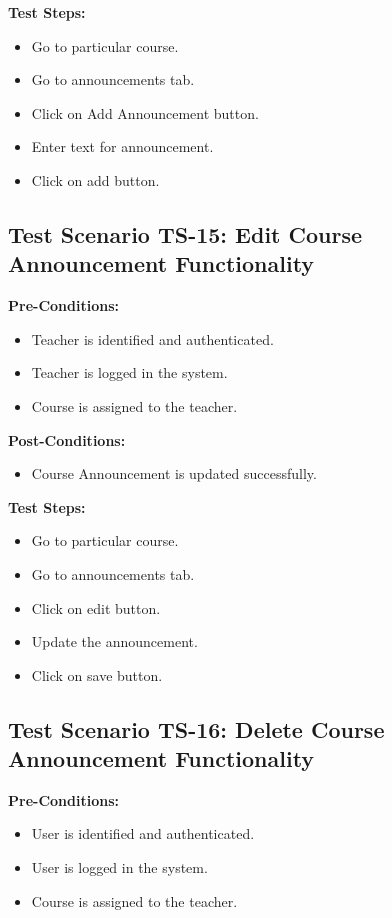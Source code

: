 \textbf{Test Steps:}
\begin{itemize}

\item Go to particular course.
\item Go to announcements tab.
\item Click on Add Announcement button.
\item Enter text for announcement.
\item Click on add button.

\end{itemize}



\subsection{Test Scenario TS-15: Edit Course Announcement Functionality}
\textbf{Pre-Conditions: }
\begin{itemize}

\item Teacher is identified and authenticated.
\item Teacher is logged in the system.
\item Course is assigned to the teacher.

\end{itemize}

\textbf{Post-Conditions: }
\begin{itemize}

\item Course Announcement is updated successfully.

\end{itemize}
\textbf{Test Steps:}
\begin{itemize}

\item Go to particular course.
\item Go to announcements tab.
\item Click on edit button.
\item Update the announcement.
\item Click on save button.

\end{itemize}


\subsection{Test Scenario TS-16: Delete Course Announcement Functionality}
\textbf{Pre-Conditions: }
\begin{itemize}

\item User is identified and authenticated.
\item User is logged in the system.
\item Course is assigned to the teacher.

\end{itemize}

